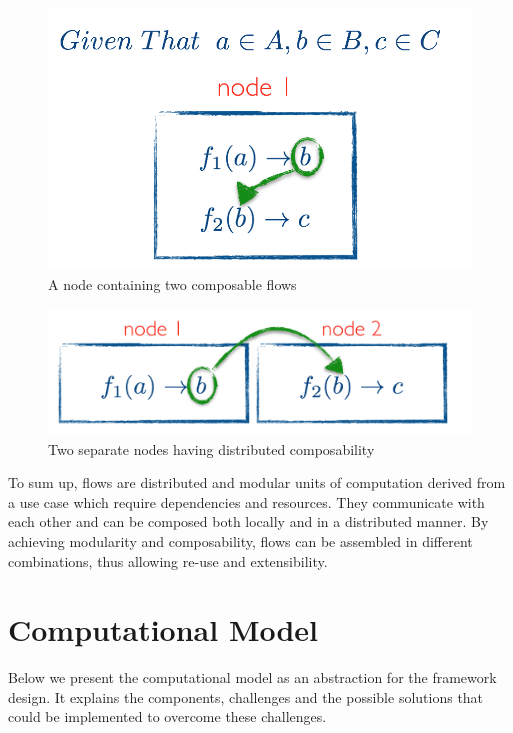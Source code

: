\begin{figure}[H]
	\centering
	\includegraphics[scale=0.5]{images/local-compose.png} 
 	\caption{A node containing two composable flows}
	\label{fig:compose}
\end{figure}
\begin{figure}[H]
	\centering
	\includegraphics[scale=0.5]{images/distributed-compose.png}
	\caption{Two separate nodes having distributed composability}
	\label{fig:compose2}
\end{figure}

\noindent To sum up, flows are distributed and modular units of computation derived from a use case which require dependencies and resources. They communicate with each other and can be composed both locally and in a distributed manner. By achieving  modularity and composability, flows can be assembled in different combinations, thus allowing re-use and extensibility.
\newpage
\section{Computational Model}

Below we present the computational model as an abstraction for the framework design. It explains the components, challenges and the possible solutions that could be implemented to overcome these challenges. 	

